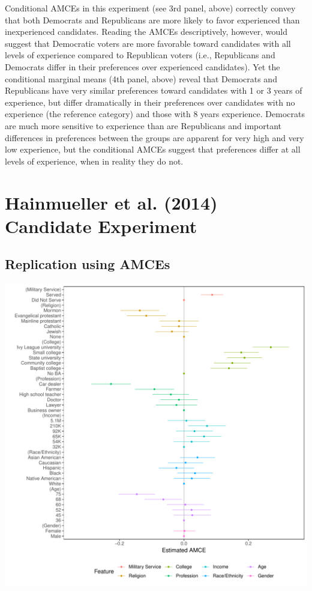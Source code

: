 \documentclass[a4paper,12pt]{article}\usepackage[]{graphicx}\usepackage[]{color}
\makeatletter
\def\maxwidth{ %
  \ifdim\Gin@nat@width>\linewidth
    \linewidth
  \else
    \Gin@nat@width
  \fi
}
\newenvironment{knitrout}{}{} %
\makeatother
\begin{document}
\noindent Conditional AMCEs in this experiment (see 3rd panel, above) correctly convey that both Democrats and Republicans are more likely to favor experienced than inexperienced candidates. Reading the AMCEs descriptively, however, would suggest that Democratic voters are more favorable toward candidates with all levels of experience compared to Republican voters (i.e., Republicans and Democrats differ in their preferences over experienced candidates). Yet the conditional marginal means (4th panel, above) reveal that Democrats and Republicans have very similar preferences toward candidates with 1 or 3 years of experience, but differ dramatically in their preferences over candidates with no experience (the reference category) and those with 8 years experience. Democrats are much more sensitive to experience than are Republicans and important differences in preferences between the groups are apparent for very high and very low experience, but the conditional AMCEs suggest that preferences differ at all levels of experience, when in reality they do not.

\clearpage 

\section{Hainmueller et al. (2014) Candidate Experiment}

\subsection{Replication using AMCEs}

\begin{knitrout}
\color{fgcolor}
\includegraphics[width=\maxwidth]{figure/hainmueller_candidate_amce_appendix-1} 

\end{knitrout}
\end{document}
